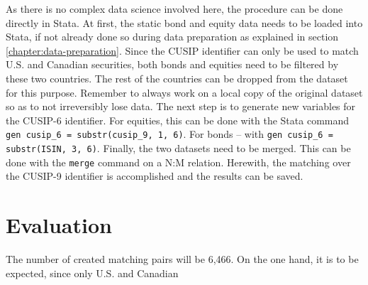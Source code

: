 As there is no complex data science involved here, the procedure can be done directly in Stata. At first, the static bond and equity data needs to be loaded into Stata, if not already done so during data preparation as explained in section \ref{chapter:data-preparation}. Since the CUSIP identifier can only be used to match U.S. and Canadian securities, both bonds and equities need to be filtered by these two countries. The rest of the countries can be dropped from the dataset for this purpose. Remember to always work on a local copy of the original dataset so as to not irreversibly lose data. The next step is to generate new variables for the CUSIP-6 identifier. For equities, this can be done with the Stata command \lstinline|gen cusip_6 = substr(cusip_9, 1, 6)|. For bonds -- with \lstinline|gen cusip_6 = substr(ISIN, 3, 6)|. Finally, the two datasets need to be merged. This can be done with the \lstinline|merge| command on a N:M relation. %
Herewith, the matching over the CUSIP-9 identifier is accomplished and the results can be saved. 

\section{Evaluation} \label{section:matching-evaluation}
The number of created matching pairs will be 6,466. On the one hand, it is to be expected, since only U.S. and Canadian


